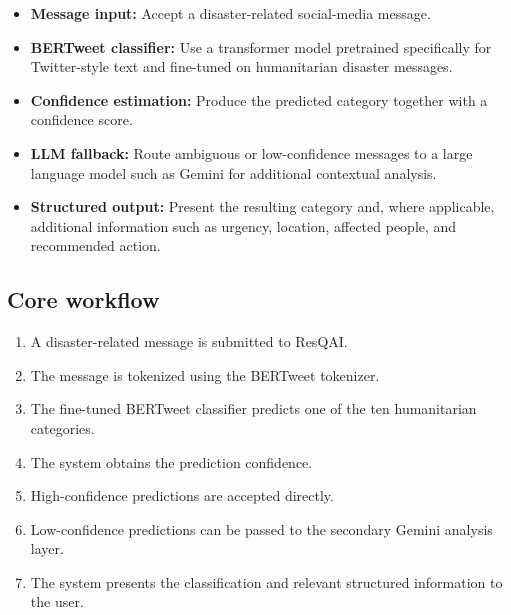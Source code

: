 \documentclass[11pt,a4paper]{article}
\begin{document}
\begin{itemize}[leftmargin=0.7cm]

    \item \textbf{Message input:} Accept a disaster-related social-media
    message.

    \item \textbf{BERTweet classifier:} Use a transformer model pretrained
    specifically for Twitter-style text and fine-tuned on humanitarian
    disaster messages.

    \item \textbf{Confidence estimation:} Produce the predicted category
    together with a confidence score.

    \item \textbf{LLM fallback:} Route ambiguous or low-confidence messages
    to a large language model such as Gemini for additional contextual
    analysis.

    \item \textbf{Structured output:} Present the resulting category and,
    where applicable, additional information such as urgency, location,
    affected people, and recommended action.

\end{itemize}

\subsection{Core workflow}

\begin{enumerate}[leftmargin=0.7cm]

    \item A disaster-related message is submitted to ResQAI.

    \item The message is tokenized using the BERTweet tokenizer.

    \item The fine-tuned BERTweet classifier predicts one of the ten
    humanitarian categories.

    \item The system obtains the prediction confidence.

    \item High-confidence predictions are accepted directly.

    \item Low-confidence predictions can be passed to the secondary Gemini
    analysis layer.

    \item The system presents the classification and relevant structured
    information to the user.

\end{enumerate}
\end{document}
